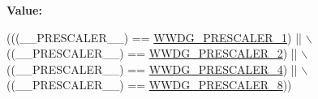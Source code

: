 {\bfseries Value\+:}
\begin{DoxyCode}
(((\_\_PRESCALER\_\_) == \hyperlink{group___w_w_d_g___prescaler_gac611617ca4116f9bfb55c5280abeb281}{WWDG\_PRESCALER\_1}) || \(\backslash\)
                                             ((\_\_PRESCALER\_\_) == 
      \hyperlink{group___w_w_d_g___prescaler_ga411e50531af74cfe88b5f58119e546fa}{WWDG\_PRESCALER\_2}) || \(\backslash\)
                                             ((\_\_PRESCALER\_\_) == 
      \hyperlink{group___w_w_d_g___prescaler_ga38093104d0ad7e9ef5e036f6d0dc3ca8}{WWDG\_PRESCALER\_4}) || \(\backslash\)
                                             ((\_\_PRESCALER\_\_) == 
      \hyperlink{group___w_w_d_g___prescaler_ga766a9eff85955164df09186081f3cb40}{WWDG\_PRESCALER\_8}))
\end{DoxyCode}
